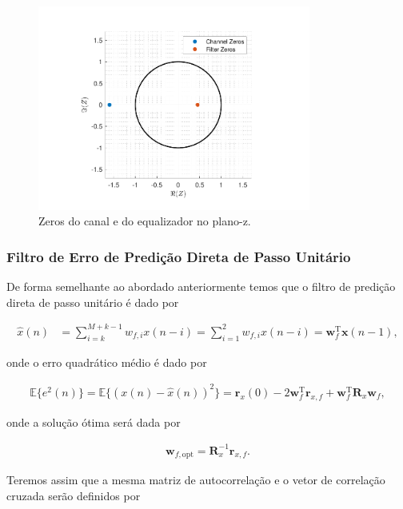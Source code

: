 \begin{figure}[!htp]
    \centering
    \includegraphics[width=0.8\textwidth]{fig/hw3p4-zeros.pdf}
    \caption{Zeros do canal e do equalizador no plano-z.}
\end{figure}


\subsubsection{Filtro de Erro de Predição Direta de Passo Unitário}
    

De forma semelhante ao abordado anteriormente temos que o filtro de predição direta de passo unitário é dado por

\begin{align}
    \hat{x}(n) &= \sum^{M + k - 1}_{i = k} w_{f,i} x(n - i) = \sum^{2}_{i = 1} w_{f,i} x(n - i) = \mathbf{w}^{\text{T}}_{f} \mathbf{x}(n - 1),
\end{align}

onde o erro quadrático médio é dado por

\begin{align}
    \mathbb{E}\{e^{2}(n)\} = \mathbb{E}\{(x(n) - \hat{x}(n) )^{2}\} = \mathbf{r}_{x}(0) - 2 \mathbf{w}^{\text{T}}_{f} \mathbf{r}_{x,f} + \mathbf{w}^{\text{T}}_{f} \mathbf{R}_{x} \mathbf{w}_{f},
\end{align}

onde a solução ótima será dada por

\begin{align}
    \mathbf{w}_{f,\text{opt}} = \mathbf{R}^{-1}_{x} \mathbf{r}_{x,f}.
\end{align}

Teremos assim que a mesma matriz de autocorrelação e o vetor de correlação cruzada serão definidos por

